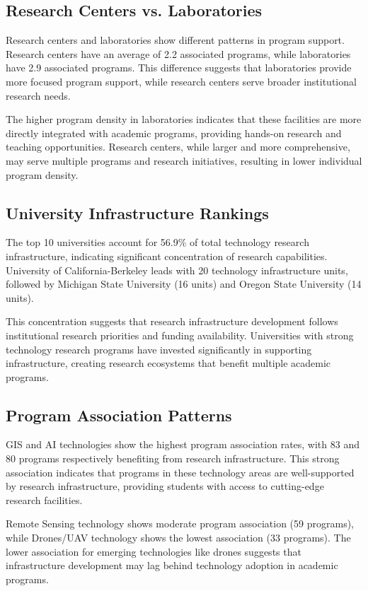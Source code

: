 \documentclass[12pt]{article}
\begin{document}
\subsection{Research Centers vs. Laboratories}
Research centers and laboratories show different patterns in program support. Research centers have an average of 2.2 associated programs, while laboratories have 2.9 associated programs. This difference suggests that laboratories provide more focused program support, while research centers serve broader institutional research needs.

The higher program density in laboratories indicates that these facilities are more directly integrated with academic programs, providing hands-on research and teaching opportunities. Research centers, while larger and more comprehensive, may serve multiple programs and research initiatives, resulting in lower individual program density.

\subsection{University Infrastructure Rankings}
The top 10 universities account for 56.9\% of total technology research infrastructure, indicating significant concentration of research capabilities. University of California-Berkeley leads with 20 technology infrastructure units, followed by Michigan State University (16 units) and Oregon State University (14 units).

This concentration suggests that research infrastructure development follows institutional research priorities and funding availability. Universities with strong technology research programs have invested significantly in supporting infrastructure, creating research ecosystems that benefit multiple academic programs.

\subsection{Program Association Patterns}
GIS and AI technologies show the highest program association rates, with 83 and 80 programs respectively benefiting from research infrastructure. This strong association indicates that programs in these technology areas are well-supported by research infrastructure, providing students with access to cutting-edge research facilities.

Remote Sensing technology shows moderate program association (59 programs), while Drones/UAV technology shows the lowest association (33 programs). The lower association for emerging technologies like drones suggests that infrastructure development may lag behind technology adoption in academic programs.
\end{document}
